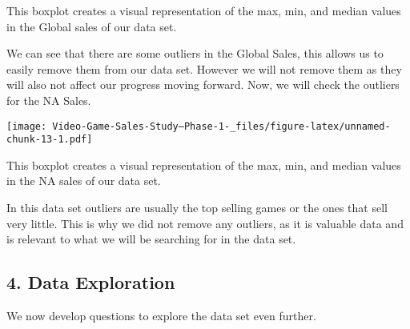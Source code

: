 \documentclass[
]{article}
\newenvironment{Shaded}{\begin{snugshade}}{\end{snugshade}}
\newcommand{\AttributeTok}[1]{\textcolor[rgb]{0.77,0.63,0.00}{#1}}
\newcommand{\CommentTok}[1]{\textcolor[rgb]{0.56,0.35,0.01}{\textit{#1}}}
\newcommand{\FunctionTok}[1]{\textcolor[rgb]{0.00,0.00,0.00}{#1}}
\newcommand{\NormalTok}[1]{#1}
\newcommand{\OtherTok}[1]{\textcolor[rgb]{0.56,0.35,0.01}{#1}}
\newcommand{\SpecialCharTok}[1]{\textcolor[rgb]{0.00,0.00,0.00}{#1}}
\newcommand{\StringTok}[1]{\textcolor[rgb]{0.31,0.60,0.02}{#1}}
\begin{document}
This boxplot creates a visual representation of the max, min, and median
values in the Global sales of our data set.

We can see that there are some outliers in the Global Sales, this allows
us to easily remove them from our data set. However we will not remove
them as they will also not affect our progress moving forward. Now, we
will check the outliers for the NA Sales.

\begin{Shaded}
\end{Shaded}

\texttt{[image: Video-Game-Sales-Study--Phase-1-\_files/figure-latex/unnamed-chunk-13-1.pdf]}

\begin{Shaded}
\end{Shaded}

This boxplot creates a visual representation of the max, min, and median
values in the NA sales of our data set.

In this data set outliers are usually the top selling games or the ones
that sell very little. This is why we did not remove any outliers, as it
is valuable data and is relevant to what we will be searching for in the
data set.

\hypertarget{data-exploration}{%
\subsection{4. Data Exploration}\label{data-exploration}}

We now develop questions to explore the data set even further.
\end{document}
